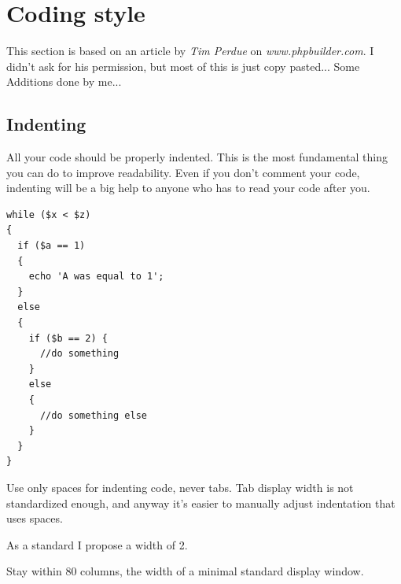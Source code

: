 \documentclass[headexclude,footexclude,12pt,BCOR0pt,DIV15]{scrartcl}
\begin{document}
\thispagestyle{plain}
\tableofcontents

\section{Coding style}
    This section is based on an article by \emph{Tim Perdue} on \emph{www.phpbuilder.com}.
    I didn't ask for his permission, but most of this is just copy pasted... Some Additions done by me...

    \subsection{Indenting}
        All your code should be properly indented. This is the most fundamental thing you can do to
        improve readability. Even if you don't comment your code, indenting will be a big help to anyone
        who has to read your code after you.

        \begin{lstlisting}[stepnumber=0,frame={}]
while ($x < $z)
{
  if ($a == 1)
  {
    echo 'A was equal to 1';
  }
  else
  {
    if ($b == 2) {
      //do something
    }
    else
    {
      //do something else
    }
  }
}
        \end{lstlisting}

        Use only spaces for indenting code, never tabs.  Tab display width is not standardized enough,
        and anyway it's easier to manually adjust indentation that uses spaces.

        As a standard I propose a width of 2.

        Stay within 80 columns, the width of a minimal standard display window.
\end{document}
